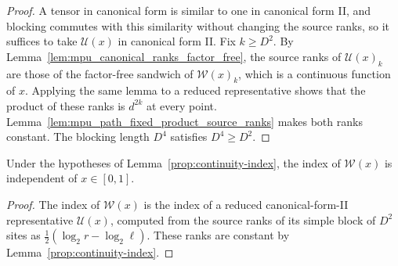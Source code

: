 \begin{proof}\leanok
    A tensor in canonical form is similar to one in canonical form II, and
    blocking commutes with this similarity without changing the source ranks,
    so it suffices to take $\mathcal U(x)$ in canonical form II. Fix
    $k\geq D^2$. By Lemma~\ref{lem:mpu_canonical_ranks_factor_free}, the source
    ranks of $\mathcal U(x)_k$ are those of the factor-free sandwich of
    $\mathcal W(x)_k$, which is a continuous function of $x$. Applying the same
    lemma to a reduced representative shows that the product of these ranks is
    $d^{2k}$ at every point. Lemma~\ref{lem:mpu_path_fixed_product_source_ranks}
    makes both ranks constant. The blocking length $D^4$ satisfies
    $D^4\geq D^2$.
\end{proof}

\begin{lemma}
    \label{thm:mpu_path_index_constant}
    \leanok
    Under the hypotheses of Lemma~\ref{prop:continuity-index}, the index of
    $\mathcal W(x)$ is independent of $x\in[0,1]$.
\end{lemma}

\begin{proof}\leanok
    The index of $\mathcal W(x)$ is the index of a reduced canonical-form-II
    representative $\mathcal U(x)$, computed from the source ranks of its
    simple block of $D^2$ sites as
    $\tfrac12(\log_2r-\log_2\ell)$. These ranks are constant by
    Lemma~\ref{prop:continuity-index}.
\end{proof}

